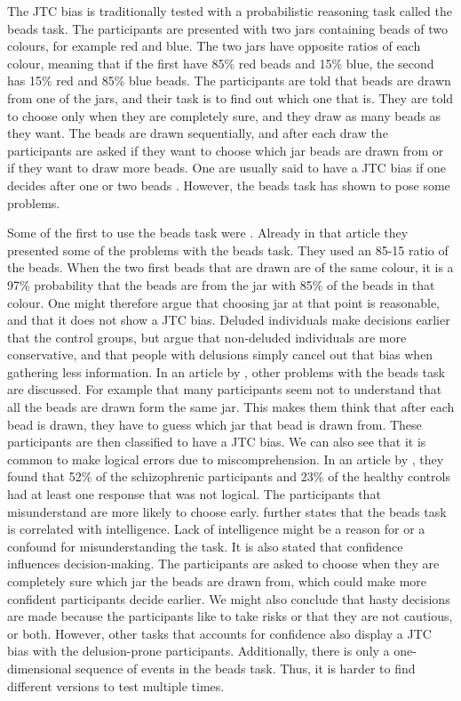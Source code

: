 The JTC bias is traditionally tested with a probabilistic reasoning task called the beads task. The participants are presented with two jars containing beads of two colours, for example red and blue. The two jars have opposite ratios of each colour, meaning that if the first have 85\% red beads and 15\% blue, the second has 15\% red and 85\% blue beads. The participants are told that beads are drawn from one of the jars, and their task is to find out which one that is. They are told to choose only when they are completely sure, and they draw as many beads as they want. The beads are drawn sequentially, and after each draw the participants are asked if they want to choose which jar beads are drawn from or if they want to draw more beads. One are usually said to have a JTC bias if one decides after one or two beads \citep{moritz2017}. However, the beads task has shown to pose some problems.

Some of the first to use the beads task were \citet{huq1988}. Already in that article they presented some of the problems with the beads task. They used an 85-15 ratio of the beads. When the two first beads that are drawn are of the same colour, it is a 97\% probability that the beads are from the jar with 85\% of the beads in that colour. One might therefore argue that choosing jar at that point is reasonable, and that it does not show a JTC bias. Deluded individuals make decisions earlier that the control groups, but \citeauthor{huq1988} argue that non-deluded individuals are more conservative, and that people with delusions simply cancel out that bias when gathering less information. In an article by \citet{moritz2017}, other problems with the beads task are discussed. For example that many participants seem not to understand that all the beads are drawn form the same jar. This makes them think that after each bead is drawn, they have to guess which jar that bead is drawn from. These participants are then classified to have a JTC bias. We can also see that it is common to make logical errors due to miscomprehension. In an article by \citet{moritz2005}, they found that 52\% of the schizophrenic participants and 23\% of the healthy controls had at least one response that was not logical. The participants that misunderstand are more likely to choose early. \citet{moritz2017} further states that the beads task is correlated with intelligence. Lack of intelligence might be a reason for or a confound for misunderstanding the task. It is also stated that confidence influences decision-making. The participants are asked to choose when they are completely sure which jar the beads are drawn from, which could make more confident participants decide earlier. We might also conclude that hasty decisions are made because the participants like to take risks or that they are not cautious, or both. However, other tasks that accounts for confidence also display a JTC bias with the delusion-prone participants. Additionally, there is only a one-dimensional sequence of events in the beads task. Thus, it is harder to find different versions to test multiple times. 

